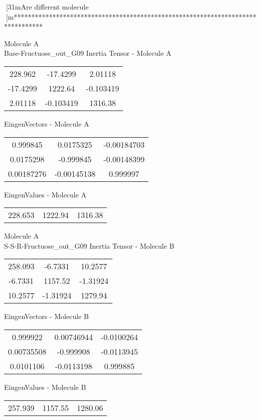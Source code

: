 [31mAre different molecule
[m********************************************************************************
\newpage
\begin{multicols}{2}
\begin{center}
Molecule A \\ 
Base-Fructuose_out_G09
Inertia Tensor - Molecule A \\
\vtab
\begin{tabular}{|c c c|}
228.962	 & 	-17.4299	 & 	2.01118	 \\
-17.4299	 & 	1222.64	 & 	-0.103419	 \\
2.01118	 & 	-0.103419	 & 	1316.38
\end{tabular}

\vtab
 EingenVectors - Molecule A     \\
\vtab
\begin{tabular}{|c c c|}
0.999845	 & 	0.0175325	 & 	-0.00184703	 \\
0.0175298	 & 	-0.999845	 & 	-0.00148399	 \\
0.00187276	 & 	-0.00145138	 & 	0.999997
\end{tabular}

\vtab
 EingenValues - Molecule A     \\
\vtab
\begin{tabular}{|c c c|}
228.653	 & 	1222.94	 & 	1316.38
\end{tabular}
\columnbreak
Molecule A \\ 
S-S-R-Fructuose_out_G09
Inertia Tensor - Molecule B \\
\vtab
\begin{tabular}{|c c c|}
258.093	 & 	-6.7331	 & 	10.2577	 \\
-6.7331	 & 	1157.52	 & 	-1.31924	 \\
10.2577	 & 	-1.31924	 & 	1279.94
\end{tabular}

\vtab
 EingenVectors - Molecule B     \\
\vtab
\begin{tabular}{|c c c|}
0.999922	 & 	0.00746944	 & 	-0.0100264	 \\
0.00735508	 & 	-0.999908	 & 	-0.0113945	 \\
0.0101106	 & 	-0.0113198	 & 	0.999885
\end{tabular}

\vtab
 EingenValues - Molecule B     \\
\vtab
\begin{tabular}{|c c c|}
257.939	 & 	1157.55	 & 	1280.06
\end{tabular}
\end{center}
\end{multicols}
